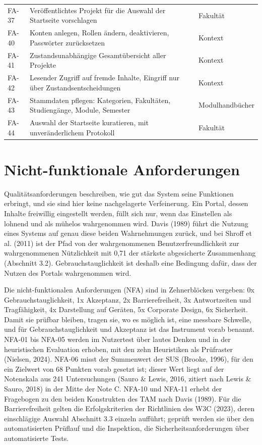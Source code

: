 \begin{longtable}{@{}L{1.5cm}L{9.2cm}L{3.8cm}@{}}
	FA-37 & Veröffentlichtes Projekt für die Auswahl der Startseite vorschlagen & Fakultät \\
	FA-40 & Konten anlegen, Rollen ändern, deaktivieren, Passwörter zurücksetzen & Kontext \\
	FA-41 & Zustandsunabhängige Gesamtübersicht aller Projekte & Kontext \\
	FA-42 & Lesender Zugriff auf fremde Inhalte, Eingriff nur über Zustandsentscheidungen & Kontext \\
	FA-43 & Stammdaten pflegen: Kategorien, Fakultäten, Studiengänge, Module, Semester & Modulhandbücher \\
	FA-44 & Auswahl der Startseite kuratieren, mit unveränderlichem Protokoll & Fakultät \\
\end{longtable}
\endgroup

\section{Nicht-funktionale Anforderungen}
\label{sec:nicht-funktionale-anforderungen}

Qualitätsanforderungen beschreiben, wie gut das System seine Funktionen erbringt, und sie sind hier keine nachgelagerte Verfeinerung. Ein Portal, dessen Inhalte freiwillig eingestellt werden, füllt sich nur, wenn das Einstellen als lohnend und als mühelos wahrgenommen wird. Davis (1989) führt die Nutzung eines Systems auf genau diese beiden Wahrnehmungen zurück, und bei Shroff et al. (2011) ist der Pfad von der wahrgenommenen Benutzerfreundlichkeit zur wahrgenommenen Nützlichkeit mit 0,71 der stärkste abgesicherte Zusammenhang (Abschnitt 3.2). Gebrauchstauglichkeit ist deshalb eine Bedingung dafür, dass der Nutzen des Portals wahrgenommen wird.

Die nicht-funktionalen Anforderungen (NFA) sind in Zehnerblöcken vergeben: 0x Gebrauchstauglichkeit, 1x Akzeptanz, 2x Barrierefreiheit, 3x Antwortzeiten und Tragfähigkeit, 4x Darstellung auf Geräten, 5x Corporate Design, 6x Sicherheit. Damit sie prüfbar bleiben, tragen sie, wo es möglich ist, eine messbare Schwelle, und für Gebrauchstauglichkeit und Akzeptanz ist das Instrument vorab benannt. NFA-01 bis NFA-05 werden im Nutzertest über lautes Denken und in der heuristischen Evaluation erhoben, mit den zehn Heuristiken als Prüfraster (Nielsen, 2024). NFA-06 misst der Summenwert der SUS (Brooke, 1996), für den ein Zielwert von 68 Punkten vorab gesetzt ist; dieser Wert liegt auf der Notenskala aus 241 Untersuchungen (Sauro \& Lewis, 2016, zitiert nach Lewis \& Sauro, 2018) in der Mitte der Note C. NFA-10 und NFA-11 erhebt der Fragebogen zu den beiden Konstrukten des TAM nach Davis (1989). Für die Barrierefreiheit gelten die Erfolgskriterien der Richtlinien des W3C (2023), deren einschlägige Auswahl Abschnitt 3.3 einzeln aufführt; geprüft werden sie über den automatisierten Prüflauf und die Inspektion, die Sicherheitsanforderungen über automatisierte Tests.

